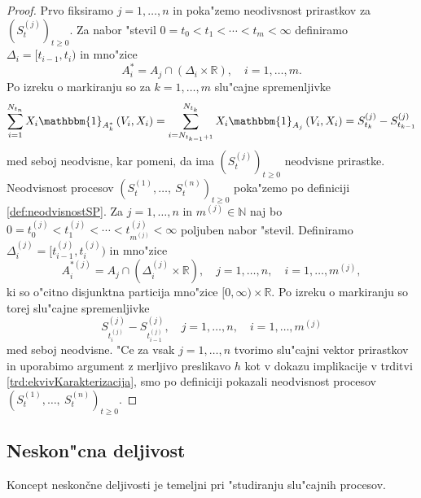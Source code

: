 \documentclass[12pt, a4paper, reqno]{amsart}
\theoremstyle{definition}
\theoremstyle{plain}
\newcommand{\R}{\mathbb{R}}
\newcommand{\N}{\mathbb{N}}
\newcommand{\1}{\mathds{1}}
\begin{document}
        \begin{proof}
            Prvo fiksiramo $j=1, \dots, n$ in poka"zemo neodivsnost prirastkov za $(S_t^{(j)})_{t\geq0}$.
            Za nabor "stevil $0 = t_0 < t_1 < \cdots < t_m < \infty$ definiramo $\Delta_i = [t_{i-1}, t_i)$ in 
            mno"zice 
            \begin{equation*}
                A_i^* = A_j \cap \left(\Delta_i \times \R\right), \quad i = 1, \dots, m.
            \end{equation*}
            Po izreku o markiranju so za $k=1, \dots, m$ slu"cajne spremenljivke 
            \begin{equation*}
                \sum_{i = 1}^{N_{t_n}}X_i\mathbbm{1}_{A_k^*}\left(V_i, X_i\right) = \sum_{i = N_{t_{k-1}+1}}^{N_{t_k}}X_i\mathbbm{1}_{A_j}\left(V_i, X_i\right) = S_{t_k}^{(j)} - S_{t_{k-1}}^{(j)}
            \end{equation*}
            med seboj neodvisne, kar pomeni, da ima $(S_t^{(j)})_{t\geq0}$ neodvisne prirastke.
            Neodvisnost procesov $(S_t^{(1)}, \dots, \ S_t^{(n)})_{t\geq0}$ poka"zemo po definiciji
            \ref{def:neodvisnostSP}. Za $j=1, \dots, n$ in $m^{(j)}\in\N$ naj bo $0 = t_0^{(j)} < t_1^{(j)} < \cdots < t^{(j)}_{m^{(j)}} < \infty$ 
            poljuben nabor "stevil. Definiramo $\Delta^{(j)}_i = [t^{(j)}_{i-1}, t^{(j)}_i)$ in mno"zice
            \begin{equation*}
                A_i^{*(j)} = A_j \cap \left(\Delta_i^{(j)} \times \R\right), \quad j = 1, \dots, n, \quad i = 1, \dots, m^{(j)},
            \end{equation*}
            ki so o"citno disjunktna particija mno"zice $[0, \infty)\times \R$. Po izreku o markiranju 
            so torej slu"cajne spremenljivke
            \begin{equation*}
                S_{t_i^{(j)}}^{(j)} - S_{t_{i-1}^{(j)}}^{(j)}, \quad j = 1, \dots, n, \quad i = 1, \dots, m^{(j)}
            \end{equation*}
            med seboj neodvisne. "Ce za vsak $j = 1, \dots, n$ tvorimo slu"cajni vektor prirastkov in uporabimo argument z merljivo preslikavo 
            $h$ kot v dokazu implikacije v trditvi \ref{trd:ekvivKarakterizacija}, smo po definiciji pokazali neodvisnost
            procesov $(S_t^{(1)}, \dots, \ S_t^{(n)})_{t\geq0}$.
            

        \end{proof}

    \subsection{Neskon"cna deljivost}
    Koncept neskončne deljivosti je 
    temeljni pri "studiranju slu"cajnih procesov. 
    
\end{document}
